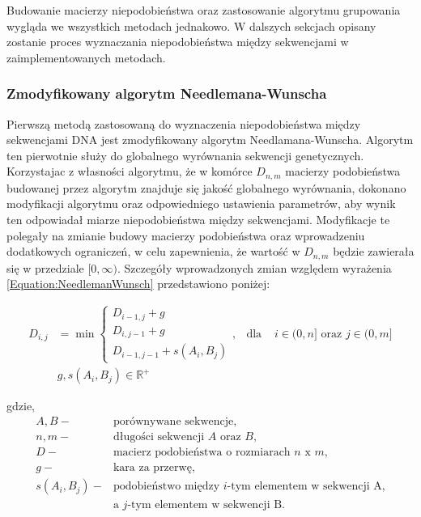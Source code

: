         Budowanie macierzy niepodobieństwa oraz zastosowanie algorytmu grupowania wygląda we wszystkich metodach jednakowo. W dalszych sekcjach opisany zostanie proces wyznaczania niepodobieństwa między sekwencjami w zaimplementowanych metodach.
        
        \subsubsection{Zmodyfikowany algorytm Needlemana-Wunscha}

            Pierwszą metodą zastosowaną do wyznaczenia niepodobieństwa między sekwencjami DNA jest  zmodyfikowany algorytm Needlamana-Wunscha. Algorytm ten pierwotnie służy do globalnego wyrównania sekwencji genetycznych. Korzystajac z własności algorytmu, że w komórce $D_{n, m}$ macierzy podobieństwa budowanej przez algorytm znajduje się jakość globalnego wyrównania, dokonano modyfikacji algorytmu oraz odpowiedniego ustawienia parametrów, aby wynik ten odpowiadał miarze niepodobieństwa między sekwencjami. Modyfikacje te polegały na zmianie budowy macierzy podobieństwa oraz wprowadzeniu dodatkowych ograniczeń, w celu zapewnienia, że wartość w $D_{n, m}$ będzie zawierała się w przedziale $[0, \infty)$. Szczegóły wprowadzonych zmian względem wyrażenia \eqref{Equation:NeedlemanWunsch} przedstawiono poniżej:

            \begin{equation}
                \begin{aligned}
                    D_{i,j} &= \min
                    \begin{cases}
                    D_{i - 1, j} + g \\
                    D_{i, j - 1} + g \\
                    D_{i - 1, j - 1} + s(A_i, B_j)
                    \end{cases}, & \text{dla } & i \in (0, n] \text{ oraz } j \in (0, m] \\
                    & g, s(A_i, B_j) \in \mathbb{R}^{+}
                \end{aligned}
            \end{equation}

            gdzie,
            \begin{align*} 
                A, B -& \text{porównywane sekwencje}, \\
                n, m -& \text{długości sekwencji } A \text{ oraz } B, \\
                D -& \text{macierz podobieństwa o rozmiarach } n \text{ x } m, \\
                g -& \text{kara za przerwę}, \\
                s(A_i, B_j) -& \text{podobieństwo między  } i\text{-tym elementem w sekwencji A,} \\ 
                & \text{a } j \text{-tym elementem w sekwencji B}. \\
            \end{align*}

